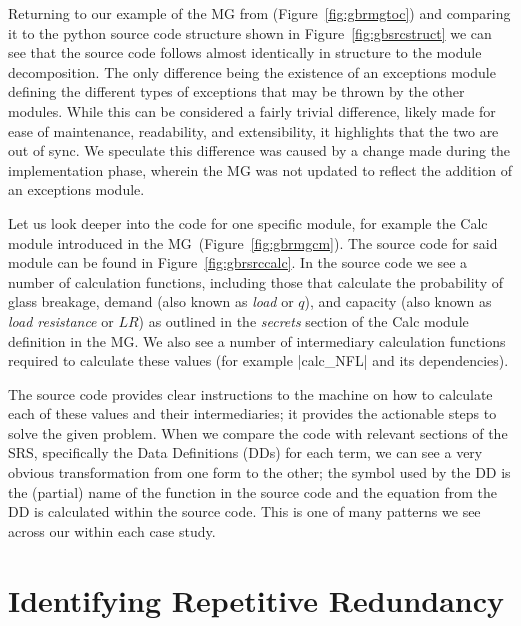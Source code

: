 Returning to our example of the MG from \gb{} (Figure~\ref{fig:gbrmgtoc}) and 
comparing it to the python source code structure shown in 
Figure~\ref{fig:gbsrcstruct} we can see that the source code follows almost 
identically in structure to the module decomposition. The only difference being 
the existence of an exceptions module defining the different types of
exceptions that may be thrown by the other modules. While this can be 
considered a fairly trivial difference, likely made for ease of maintenance, 
readability, and extensibility, it highlights that the two \sfs{} are out of 
sync. We speculate this difference was caused by a change made during the 
implementation phase, wherein the MG was not updated to reflect the addition of 
an exceptions module.


Let us look deeper into the code for one specific module, for example the Calc 
module introduced in the MG~(Figure~\ref{fig:gbrmgcm}). The source code for 
said module can be found in Figure~\ref{fig:gbrsrccalc}. In the source code we 
see a number of calculation functions, including those that calculate the 
probability of glass breakage, demand (also known as \emph{load} or $q$), and 
capacity (also known as \emph{load resistance} or $LR$) as outlined in the 
\emph{secrets} section of the Calc module definition in the MG. We also see a 
number of intermediary calculation functions required to calculate these values 
(for example |calc_NFL| and its dependencies).

The source code provides clear instructions to the machine on how to calculate 
each of these values and their intermediaries; it provides the actionable steps 
to solve the given problem. When we compare the code with relevant sections of 
the SRS, specifically the Data Definitions (DDs) for each term, we can see a 
very obvious transformation from one form to the other; the symbol used by the 
DD is the (partial) name of the function in the source code and the equation 
from the DD is calculated within the source code. This is one of many patterns 
we see across our \sfs{} within each case study.

\section{Identifying Repetitive Redundancy}
\label{sec:patterns}

